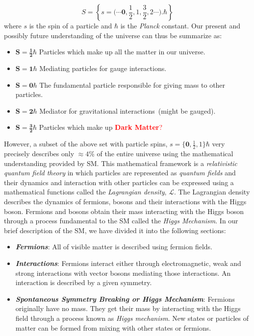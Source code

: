 \begin{equation*}
S =\left \{s=\Big(\cdots \mathbf{0}, \frac{1}{2}, 1,  \frac{3}{2}, 2  \cdots \Big).\hbar\right \}
\end{equation*}
where  $s$ is the spin of a particle and $\hbar$ is the \textit{Planck} constant. 
Our present and possibly future understanding of the universe can thus be summarize as:
 \begin{itemize}
  \item $\mathbf{S = \frac{1}{2}\hbar}$ Particles which make up all the matter in our universe.
  \item $\mathbf{S = 1\hbar}$ Mediating particles for gauge interactions.
  \item $\mathbf{S = 0\hbar}$ The fundamental particle responsible for giving mass to other particles.
  \item $\mathbf{S = 2\hbar}$ Mediator for gravitational interactions~(might be gauged).
  \item $\mathbf{S = \frac{3}{2}\hbar}$ Particles which make up \textcolor{red}{\textbf{Dark Matter}?}
 \end{itemize}
However, a subset of the above set with particle spins, $s =\Big\{\mathbf{0}, \frac{1}{2}, 1\Big\}\hbar$ very precisely describes only $\approx 4$\% of the entire universe using the mathematical understanding provided by SM. This mathematical framework 
is a \textit{relativistic quantum field theory} in which particles are represented as \textit{quantum fields} and their dynamics and interaction with other particles can be expressed using a mathematical functions called the \textit{Lagrangian density}, $\mathcal{L}$. The Lagrangian density describes the dynamics of fermions, bosons and their interactions with the Higgs boson. Fermions and bosons obtain their mass interacting with the Higgs boson through a process fundamental to the SM called the \textit{Higgs Mechanism}.
In our brief description of the SM, we have divided it into the following sections:

\begin{itemize}
\item \textbf{\textit{Fermions}}: All of visible matter is described using fermion fields.
\item \textbf{\textit{Interactions}}: Fermions interact either through electromagnetic, weak and strong interactions with vector bosons mediating  those interactions. An interaction is described by a given symmetry.
\item \textbf{\textit{Spontaneous Symmetry Breaking or Higgs Mechanism}}: Fermions originally have no mass. They get their mass by interacting with the Higgs field through a process known as \textit{Higgs mechanism}. New states or particles of matter can be formed from mixing with other states or fermions.

\end{itemize}
